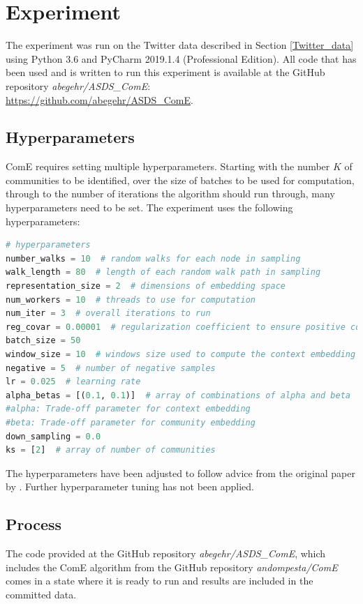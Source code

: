 \documentclass[sigconf]{acmart}
\begin{document}
\section{Experiment}

The experiment was run on the Twitter data described in Section \ref{Twitter_data} using Python 3.6 and PyCharm 2019.1.4 (Professional Edition). All code that has been used and is written to run this experiment is available at the GitHub repository \textit{abegehr/ASDS\_ComE}:\\\url{https://github.com/abegehr/ASDS_ComE}.\cite{asds}

\subsection{Hyperparameters}

ComE requires setting multiple hyperparameters. Starting with the number $K$ of communities to be identified, over the size of batches to be used for computation, through to the number of iterations the algorithm should run through, many hyperparameters need to be set.
The experiment uses the following hyperparameters:\cite{Cav17}

\begin{lstlisting}[language=python]
# hyperparameters
number_walks = 10  # random walks for each node in sampling
walk_length = 80  # length of each random walk path in sampling
representation_size = 2  # dimensions of embedding space
num_workers = 10  # threads to use for computation
num_iter = 3  # overall iterations to run
reg_covar = 0.00001  # regularization coefficient to ensure positive covariance
batch_size = 50
window_size = 10  # windows size used to compute the context embedding
negative = 5  # number of negative samples
lr = 0.025  # learning rate
alpha_betas = [(0.1, 0.1)]  # array of combinations of alpha and beta
#alpha: Trade-off parameter for context embedding
#beta: Trade-off parameter for community embedding
down_sampling = 0.0
ks = [2]  # array of number of communities
\end{lstlisting}

The hyperparameters have been adjusted to follow advice from the original paper by \citet{Cav17}. Further hyperparameter tuning has not been applied.

\subsection{Process}

The code provided at the GitHub repository \textit{abegehr/ASDS\_ComE}\cite{asds}, which includes the ComE algorithm from the GitHub repository \textit{andompesta/ComE}\cite{ComE} comes in a state where it is ready to run and results are included in the committed data.
\end{document}
